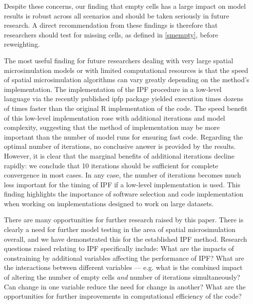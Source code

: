 \documentclass[a4paper,10pt]{article}
\begin{document}
Despite these concerns, our finding that empty cells has a large impact on model
results is robust across all scenarios and should be taken seriously in future research.
A direct recommendation from these findings is therefore that researchers should
test for missing cells, as defined in \cref{smempty}, before reweighting.

The most useful finding for future researchers dealing with very large spatial microsimulation
models or with limited computational resources is that the speed of spatial microsimulation
algorithms can vary greatly depending on the method's implementation. The implementation
of the IPF procedure in a low-level language via the recently published ipfp package
yielded execution times dozens of times faster than the original R implementation of
the code. The speed benefit of this low-level implementation rose with additional iterations
and model complexity, suggesting that the method of implementation may be more important than
the number of model runs for ensuring fast code. Regarding the optimal number of iterations,
no conclusive answer is provided by the results. However, it is clear that
the marginal benefits of additional iterations decline rapidly: we conclude that 10 iterations
should be sufficient for complete convergence in most cases.
In any case, the number of iterations becomes much less important
for the timing of IPF if a low-level implementation is used.
This finding highlights the importance of software selection
and code implementation when working on implementations designed to work on large datasets.

There are many opportunities for further research raised by this paper.
There is clearly a need for further model testing in the area of spatial microsimulation overall,
and we have demonstrated this for the established IPF method. Research questions
raised relating to IPF specifically include:
What are the impacts of constraining by additional variables affecting the performance of IPF?
What are the interactions between different variables --- e.g. what is the
combined impact of altering the number of empty cells \emph{and} number of
iterations simultaneously? Can change in one variable reduce the need for
change in another? What are the opportunities for further improvements in computational efficiency
of the code?
\end{document}
